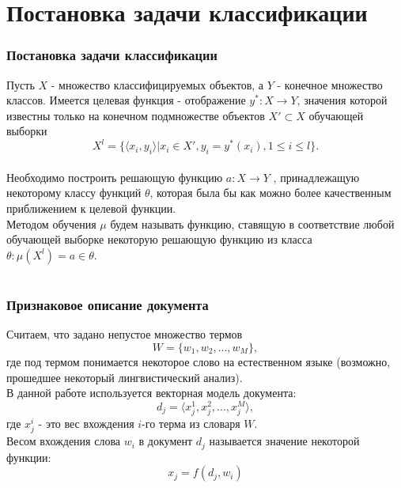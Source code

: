 \documentclass{beamer}
\begin{document}
\section{Постановка задачи классификации}
\begin{frame}
\end{frame}

\begin{frame}
\frametitle{Постановка задачи классификации}
Пусть $X$ - множество классифицируемых объектов, а $Y$ - конечное множество классов. Имеется целевая функция - отображение $y^*:X\rightarrow Y$, значения которой известны только на конечном подмножестве объектов $X' \subset X$ обучающей выборки \\
$$X^l=\{\langle x_i,y_i \rangle |x_i \in X', y_i=y^*(x_i),1\le i \le l\}.$$
\\Необходимо построить решающую функцию $a: X \rightarrow Y$ , принадлежащую
некоторому классу функций $\theta$, которая была бы как можно более качественным
приближением к целевой функции. 
\\Методом обучения $\mu$ будем называть функцию, ставящую в соответствие любой обучающей выборке некоторую
решающую функцию из класса $\theta: \mu(X^l)=a \in \theta.$
\end{frame}

\section{}
\begin{frame}
\frametitle{Признаковое описание документа}
Считаем, что задано непустое множество термов $$W=\{w_1,w_2,...,w_M\},$$
где под термом понимается некоторое слово на естественном языке (возможно, прошедшее некоторый лингвистический анализ). \\
В данной работе используется векторная модель документа:$$d_j=\langle x_j^1,x_j^2,...,x_j^M\rangle,$$ где $x_j^i$ - это вес вхождения $i$-го терма из словаря $W$.\\
Весом вхождения слова $w_i$ в документ $d_j$ называется значение некоторой функции:
$$x_j=f(d_j,w_i)$$
\end{frame}
\end{document}
